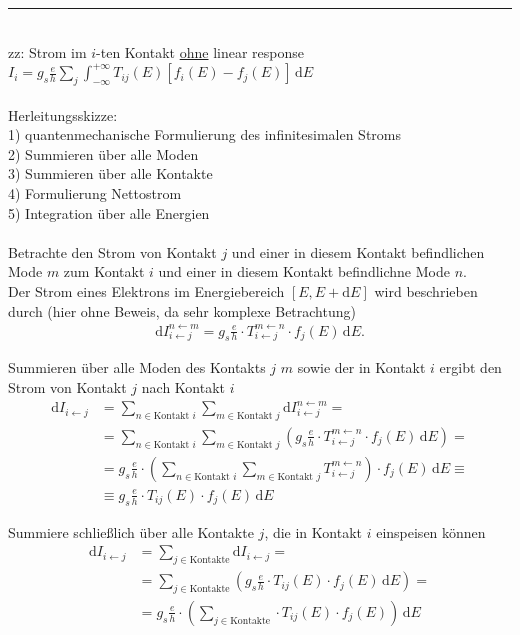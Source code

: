 \documentclass{article}
\newcommand{\diff}{\mathrm{d}}
\newcommand{\lr}[1]{\left(#1\right)}
\newcommand{\lreck}[1]{\left[#1\right]}
\begin{document}
{\color{violet}
\hrule
	\\
	zz: Strom im $i$-ten Kontakt \underline{ohne} linear response $I_i = g_s \frac{e}{h} \sum_j \int_{-\infty}^{+\infty} T_{ij}(E) \lreck{ f_i(E) - f_j(E) } \, \diff E$\\
	\\
	Herleitungsskizze:\\
	1) quantenmechanische Formulierung des infinitesimalen Stroms \\
	2) Summieren über alle Moden \\
	3) Summieren über alle Kontakte \\
	4) Formulierung Nettostrom \\
	5) Integration über alle Energien \\
	\\
	Betrachte den Strom von Kontakt $j$ und einer in diesem Kontakt befindlichen Mode $m$ zum Kontakt $i$ und einer in diesem Kontakt befindlichne Mode $n$.\\
	Der Strom eines Elektrons im Energiebereich $[E, E+\diff E]$ wird beschrieben durch \textcolor{gruen}{(hier ohne Beweis, da sehr komplexe Betrachtung)}
		\begin{align*}
			\diff I_{i \leftarrow j}^{n \leftarrow m} = g_s \frac{e}{h} \cdot  T_{i \leftarrow j}^{m \leftarrow n} \cdot f_j(E) \, \diff E.
		\end{align*}
	
	Summieren über alle Moden des Kontakts $j$ $m$ sowie der in Kontakt $i$ ergibt den Strom von Kontakt $j$ nach Kontakt $i$
		\begin{align*}
			\diff I_{i \leftarrow j} &= \sum_{n \in \text{Kontakt $i$}} \sum_{m \in \text{Kontakt $j$}} \diff I_{i \leftarrow j}^{n \leftarrow m} = \\
			&= \sum_{n \in \text{Kontakt $i$}} \sum_{m \in \text{Kontakt $j$}} \lr{ g_s \frac{e}{h} \cdot T_{i \leftarrow j}^{m \leftarrow n} \cdot f_j(E) \, \diff E } = \\
			&= g_s \frac{e}{h} \cdot \lr{ \sum_{n \in \text{Kontakt $i$}} \sum_{m \in \text{Kontakt $j$}} T_{i \leftarrow j}^{m \leftarrow n} } \cdot f_j(E) \, \diff E \equiv \\
			&\equiv g_s \frac{e}{h} \cdot T_{ij}(E) \cdot f_j(E) \, \diff E
		\end{align*}

	Summiere schließlich über alle Kontakte $j$, die in Kontakt $i$ einspeisen können
		\begin{align*}
			\diff I_{i \leftarrow j} &= \sum_{j \in \text{Kontakte}} \diff I_{i \leftarrow j} = \\
			&= \sum_{j \in \text{Kontakte}} \lr{ g_s \frac{e}{h} \cdot T_{ij}(E) \cdot f_j(E) \, \diff E } = \\
			&= g_s \frac{e}{h} \cdot \lr{ \sum_{j \in \text{Kontakte}}  \cdot T_{ij}(E) \cdot f_j(E) } \, \diff E
		\end{align*}
	
}
\end{document}
